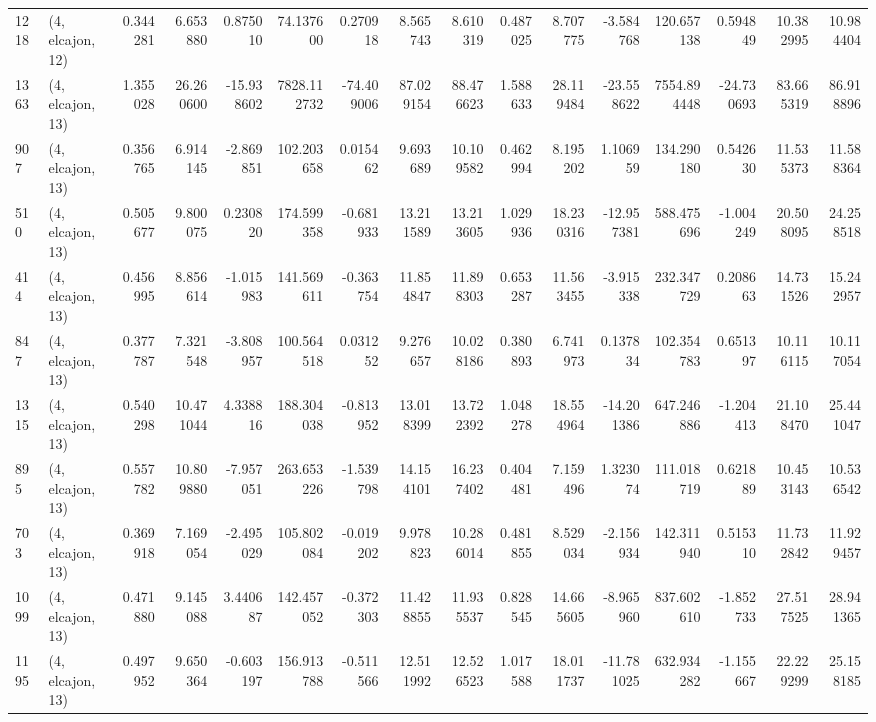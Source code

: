 \begin{tabular}{llrrrrrrrrrrrrrr}
1218 &  (4, elcajon, 12) &   0.344281 &   6.653880 &   0.875010 &     74.137600 &    0.270918 &    8.565743 &    8.610319 &  0.487025 &   8.707775 &  -3.584768 &   120.657138 &   0.594849 &  10.382995 &  10.984404 \\
1363 &  (4, elcajon, 13) &   1.355028 &  26.260600 & -15.938602 &   7828.112732 &  -74.409006 &   87.029154 &   88.476623 &  1.588633 &  28.119484 & -23.558622 &  7554.894448 & -24.730693 &  83.665319 &  86.918896 \\
907  &  (4, elcajon, 13) &   0.356765 &   6.914145 &  -2.869851 &    102.203658 &    0.015462 &    9.693689 &   10.109582 &  0.462994 &   8.195202 &   1.106959 &   134.290180 &   0.542630 &  11.535373 &  11.588364 \\
510  &  (4, elcajon, 13) &   0.505677 &   9.800075 &   0.230820 &    174.599358 &   -0.681933 &   13.211589 &   13.213605 &  1.029936 &  18.230316 & -12.957381 &   588.475696 &  -1.004249 &  20.508095 &  24.258518 \\
414  &  (4, elcajon, 13) &   0.456995 &   8.856614 &  -1.015983 &    141.569611 &   -0.363754 &   11.854847 &   11.898303 &  0.653287 &  11.563455 &  -3.915338 &   232.347729 &   0.208663 &  14.731526 &  15.242957 \\
847  &  (4, elcajon, 13) &   0.377787 &   7.321548 &  -3.808957 &    100.564518 &    0.031252 &    9.276657 &   10.028186 &  0.380893 &   6.741973 &   0.137834 &   102.354783 &   0.651397 &  10.116115 &  10.117054 \\
1315 &  (4, elcajon, 13) &   0.540298 &  10.471044 &   4.338816 &    188.304038 &   -0.813952 &   13.018399 &   13.722392 &  1.048278 &  18.554964 & -14.201386 &   647.246886 &  -1.204413 &  21.108470 &  25.441047 \\
895  &  (4, elcajon, 13) &   0.557782 &  10.809880 &  -7.957051 &    263.653226 &   -1.539798 &   14.154101 &   16.237402 &  0.404481 &   7.159496 &   1.323074 &   111.018719 &   0.621889 &  10.453143 &  10.536542 \\
703  &  (4, elcajon, 13) &   0.369918 &   7.169054 &  -2.495029 &    105.802084 &   -0.019202 &    9.978823 &   10.286014 &  0.481855 &   8.529034 &  -2.156934 &   142.311940 &   0.515310 &  11.732842 &  11.929457 \\
1099 &  (4, elcajon, 13) &   0.471880 &   9.145088 &   3.440687 &    142.457052 &   -0.372303 &   11.428855 &   11.935537 &  0.828545 &  14.665605 &  -8.965960 &   837.602610 &  -1.852733 &  27.517525 &  28.941365 \\
1195 &  (4, elcajon, 13) &   0.497952 &   9.650364 &  -0.603197 &    156.913788 &   -0.511566 &   12.511992 &   12.526523 &  1.017588 &  18.011737 & -11.781025 &   632.934282 &  -1.155667 &  22.229299 &  25.158185 \\

\end{tabular}
